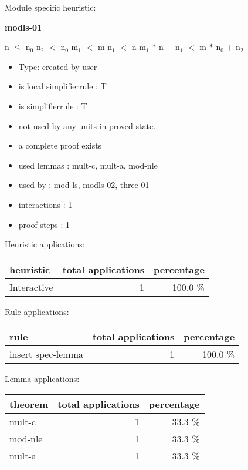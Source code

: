 \documentclass[a4paper]{article}
\begin{document}
Module specific heuristic:

\pagebreak

{\LARGE\bf modls-01}\label{lemma-modls-01}

\medskip

 \Fol n $\le$ $\mbox{n}_{0}$ \And $\mbox{n}_{2}$ $<$ $\mbox{n}_{0}$ \And $\mbox{m}_{1}$ $<$ m \And $\mbox{n}_{1}$ $<$ n \Imp $\mbox{m}_{1}$ $*$ n + $\mbox{n}_{1}$ $<$ m $*$ $\mbox{n}_{0}$ + $\mbox{n}_{2}$

\begin{itemize}

\item Type: created by user

\item is local simplifierrule : T
\item is simplifierrule : T
\item not used by any units in proved state.
\item       a complete proof exists
\item       used lemmas  : mult-c, mult-a, mod-nle
\item       used by      : mod-ls, modls-02, three-01
\item       interactions : 1
\item       proof steps  : 1
\end{itemize}

\medskip


Heuristic applications:

\begin{supertabular}{l|r|r}
heuristic	& total applications & percentage \\ \hline
Interactive & 1 & 100.0 \% \\

\end{supertabular}

Rule applications:

\begin{supertabular}{l|r|r}
rule	        & total applications & percentage \\ \hline
insert spec-lemma & 1 & 100.0 \% \\

\end{supertabular}

Lemma applications:

\begin{supertabular}{l|r|r}
theorem	        & total applications & percentage \\ \hline
mult-c & 1 & 33.3 \% \\
mod-nle & 1 & 33.3 \% \\
mult-a & 1 & 33.3 \% \\

\end{supertabular}
\end{document}
